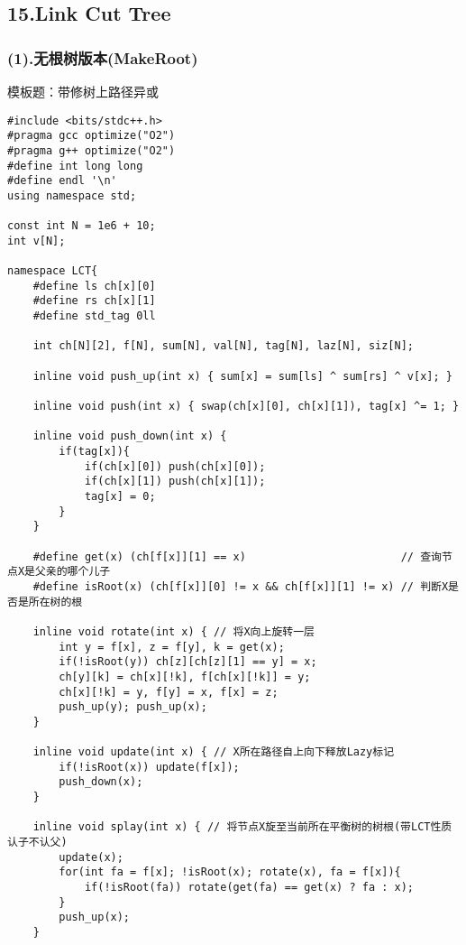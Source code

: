 \documentclass[]{article}
\begin{document}
\hypertarget{link-cut-tree}{%
\subsection{15.Link Cut Tree}\label{link-cut-tree}}

\hypertarget{ux65e0ux6839ux6811ux7248ux672cmakeroot}{%
\subsubsection{(1).无根树版本(MakeRoot)}\label{ux65e0ux6839ux6811ux7248ux672cmakeroot}}

模板题：带修树上路径异或

\begin{verbatim}
#include <bits/stdc++.h>
#pragma gcc optimize("O2")
#pragma g++ optimize("O2")
#define int long long
#define endl '\n'
using namespace std;

const int N = 1e6 + 10;
int v[N];

namespace LCT{
    #define ls ch[x][0]
    #define rs ch[x][1]
    #define std_tag 0ll

    int ch[N][2], f[N], sum[N], val[N], tag[N], laz[N], siz[N];

    inline void push_up(int x) { sum[x] = sum[ls] ^ sum[rs] ^ v[x]; }
    
    inline void push(int x) { swap(ch[x][0], ch[x][1]), tag[x] ^= 1; }

    inline void push_down(int x) {
        if(tag[x]){
            if(ch[x][0]) push(ch[x][0]);
            if(ch[x][1]) push(ch[x][1]);
            tag[x] = 0; 
        } 
    }

    #define get(x) (ch[f[x]][1] == x)                        // 查询节点X是父亲的哪个儿子
    #define isRoot(x) (ch[f[x]][0] != x && ch[f[x]][1] != x) // 判断X是否是所在树的根

    inline void rotate(int x) { // 将X向上旋转一层
        int y = f[x], z = f[y], k = get(x);
        if(!isRoot(y)) ch[z][ch[z][1] == y] = x;
        ch[y][k] = ch[x][!k], f[ch[x][!k]] = y;
        ch[x][!k] = y, f[y] = x, f[x] = z;
        push_up(y); push_up(x);
    }

    inline void update(int x) { // X所在路径自上向下释放Lazy标记
        if(!isRoot(x)) update(f[x]);
        push_down(x);
    }

    inline void splay(int x) { // 将节点X旋至当前所在平衡树的树根(带LCT性质认子不认父)
        update(x);
        for(int fa = f[x]; !isRoot(x); rotate(x), fa = f[x]){
            if(!isRoot(fa)) rotate(get(fa) == get(x) ? fa : x);
        }
        push_up(x);
    }


\end{verbatim}
\end{document}
